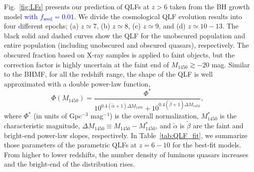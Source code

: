 \documentclass[twocolumn, twocolappendix]{aastex63}
\newcommand{\fseed}{f_\mathrm{seed}}
\newcommand{\Muv}{M_{1450}}
\newcommand{\blue}[1]{\textcolor{blue}{ #1}}
\begin{document}
\begin{CJK*}{UTF8}{gbsn}
Fig.~\ref{fig:LFs} presents our prediction of QLFs at $z>6$ taken from the BH growth model \blue{with $\fseed=0.01$.}
We divide the cosmological QLF evolution results into four different epochs; (a) $z\simeq 7$, (b) $z\simeq 8$, (c) $z\simeq 9$, and (d) $z\simeq 10-13$.
The black solid and dashed curves show the QLF for the unobscured population 
and entire population (including unobscured and obscured quasars), respectively.
The obscured fraction based on X-ray samples \citep{2014ApJ...786..104U} is applied to faint objects, 
but the correction factor is highly uncertain at the faint end of $\Muv\gtrsim -20$ mag.
Similar to the BHMF, for all the redshift range, the shape of the QLF is well approximated with a double power-law function,
%
\begin{equation}
\Phi(\Muv) = \frac{\Phi^\ast}
{10^{0.4(\tilde \alpha+1)\Delta \Muv} + 10^{0.4(\tilde \beta+1)\Delta \Muv}},
\end{equation}
%
where $\Phi^\ast$ (in units of Gpc$^{-3}$ mag$^{-1}$) is the overall normalization, $\Muv^\ast$ is the characteristic magnitude,
$\Delta \Muv \equiv \Muv - \Muv^\ast$, and $\tilde \alpha$ is $\tilde \beta$ are the faint and bright-end power-law slopes, respectively.
In Table~\ref{tab:QLF_fit}, we summarize those parameters of the parametric QLFs at $z=6-10$ for the best-fit models.
From higher to lower redshifts, the number density of luminous quasars increases and the bright-end of the distribution rises.


\end{CJK*}
\end{document}
